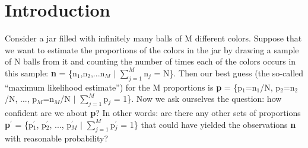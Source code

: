 \documentclass{article}
\begin{document}
\begin{center}
\begin{abstract}
\vspace{.5 cm}

\end{abstract}

 \end{center}


\section{Introduction} \label{sec:introduction}
Consider  a jar  filled  with  infinitely many  balls  of M  different
colors.   Suppose that  we want  to  estimate the  proportions of  the
colors in the jar by drawing a  sample of N balls from it and counting
the number of times each of  the colors occurs in this sample: {\bf n}
=  \{n$_1$,n$_2$,...n$_M$ $|$ $\sum_{j=1}^{M}$n$_j$  = N\}.   Then our
best guess  (the so-called ``maximum likelihood estimate'')  for the M
proportions  is   {\bf  p}  =   \{p$_1$=n$_1$/N,  p$_2$=n$_2$/N,  ...,
p$_M$=n$_M$/N $|$  $\sum_{j=1}^{M}$p$_j$ =  1\}. Now we  ask ourselves
the question: how confident are we about {\bf p}?  In other words: are
there   any   other  sets   of   proportions   {\bf  p$^{\prime}$}   =
\{p$^{\prime}_1$,    p$^{\prime}_2$,     ...,    p$^{\prime}_M$    $|$
$\sum_{j=1}^{M}$p$^{\prime}_j$  =  1\}  that  could have  yielded  the
observations {\bf n} with reasonable probability?\\
\end{document}
